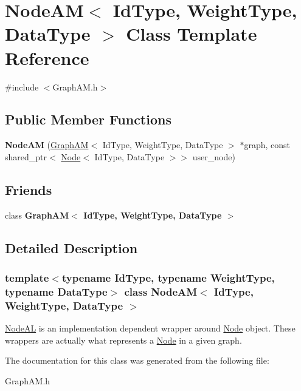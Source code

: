 \hypertarget{class_node_a_m}{}\section{Node\+AM$<$ Id\+Type, Weight\+Type, Data\+Type $>$ Class Template Reference}
\label{class_node_a_m}


{\ttfamily \#include $<$Graph\+A\+M.\+h$>$}

\subsection*{Public Member Functions}
\begin{DoxyCompactItemize}
\item 
\mbox{\label{class_node_a_m_a1b4ee34888744a216816c59d0dd5ff1d}} 
{\bfseries Node\+AM} (\hyperlink{class_graph_a_m}{Graph\+AM}$<$ Id\+Type, Weight\+Type, Data\+Type $>$ $\ast$graph, const shared\+\_\+ptr$<$ \hyperlink{class_node}{Node}$<$ Id\+Type, Data\+Type $>$$>$ user\+\_\+node)
\end{DoxyCompactItemize}
\subsection*{Friends}
\begin{DoxyCompactItemize}
\item 
\mbox{\label{class_node_a_m_a436fd9bf7b6dda51906a32b6df83648f}} 
class {\bfseries Graph\+A\+M$<$ Id\+Type, Weight\+Type, Data\+Type $>$}
\end{DoxyCompactItemize}


\subsection{Detailed Description}
\subsubsection*{template$<$typename Id\+Type, typename Weight\+Type, typename Data\+Type$>$\newline
class Node\+A\+M$<$ Id\+Type, Weight\+Type, Data\+Type $>$}

\hyperlink{class_node_a_l}{Node\+AL} is an implementation dependent wrapper around \hyperlink{class_node}{Node} object. These wrappers are actually what represents a \hyperlink{class_node}{Node} in a given graph. 

The documentation for this class was generated from the following file\+:\begin{DoxyCompactItemize}
\item 
Graph\+A\+M.\+h\end{DoxyCompactItemize}
